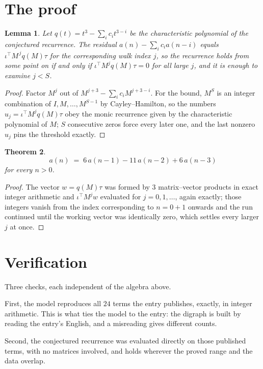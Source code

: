 \documentclass[11pt,a4paper]{article}
\theoremstyle{plain}
\newtheorem{theorem}{Theorem}
\newtheorem{lemma}[theorem]{Lemma}
\theoremstyle{definition}
\begin{document}
\section{The proof}

\begin{lemma}\label{lem:crit}
Let $q(t)=t^{3}-\sum_i c_it^{3-i}$ be the characteristic polynomial of the
conjectured recurrence. The residual $a(n)-\sum_ic_ia(n-i)$ equals
$\iota^{\!\top}M^{\,j}q(M)\tau$ for the corresponding walk index $j$, so the recurrence
holds from some point on if and only if $\iota^{\!\top}M^{j}q(M)\tau=0$ for all large $j$,
and it is enough to examine $j<S$.
\end{lemma}

\begin{proof}
Factor $M^{j}$ out of $M^{j+3}-\sum_ic_iM^{j+3-i}$. For the bound, $M^{S}$
is an integer combination of $I,M,\dots,M^{S-1}$ by Cayley--Hamilton, so the numbers
$u_j=\iota^{\!\top}M^{j}q(M)\tau$ obey the monic recurrence given by the characteristic
polynomial of $M$; $S$ consecutive zeros force every later one, and the last nonzero $u_j$
pins the threshold exactly.
\end{proof}

\begin{theorem}
\[
a(n)\;=\;6\,a(n-1) - 11\,a(n-2) + 6\,a(n-3)
\]
for every $n>0$.
\end{theorem}

\begin{proof}
The vector $w=q(M)\tau$ was formed by $3$ matrix--vector products in exact integer
arithmetic and $\iota^{\!\top}M^{j}w$ evaluated for $j=0,1,\dots$, again exactly; those
integers vanish from the index corresponding to $n=0+1$ onwards and the run continued
until the working vector was identically zero, which settles every larger $j$ at once.
\end{proof}

\section{Verification}

Three checks, each independent of the algebra above.

First, the model reproduces all $24$ terms the entry publishes, exactly, in integer
arithmetic. This is what ties the model to the entry: the digraph is built by reading the
entry's English, and a misreading gives different counts.

Second, the conjectured recurrence was evaluated directly on those published terms, with no
matrices involved, and holds wherever the proved range and the data overlap.
\end{document}
